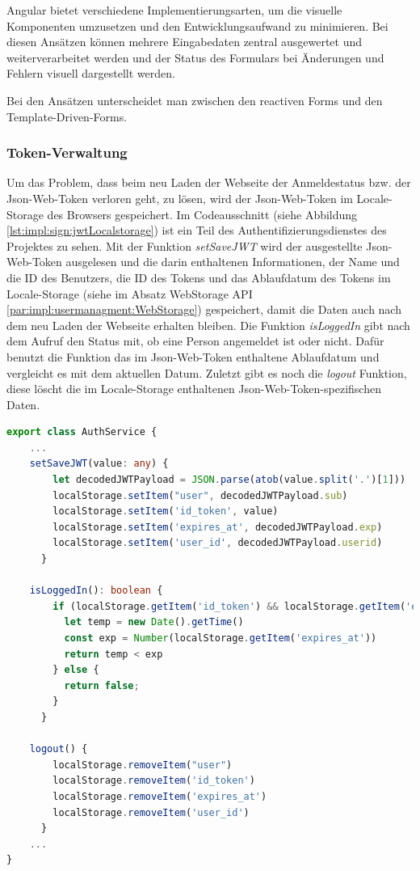 Angular bietet verschiedene Implementierungsarten, um die visuelle Komponenten umzusetzen und den Entwicklungsaufwand zu minimieren. Bei diesen Ansätzen können mehrere Eingabedaten zentral ausgewertet und weiterverarbeitet werden und der Status des Formulars bei Änderungen und Fehlern visuell dargestellt werden. \cite[Bookmonkey - 12 Formularverarbeitung und
Validierung: Iteration IV]{AngularBuch}

Bei den Ansätzen unterscheidet man zwischen den reactiven Forms und den Template-Driven-Forms.

\subsubsection{Token-Verwaltung}
\label{sec:tokenveraltung}
Um das Problem, dass beim neu Laden der Webseite der Anmeldestatus bzw. der Json-Web-Token verloren geht, zu lösen, wird der Json-Web-Token im Locale-Storage des Browsers gespeichert. 
Im Codeausschnitt (siehe Abbildung \ref{lst:impl:sign:jwtLocalstorage}) ist ein Teil des Authentifizierungsdienstes des Projektes zu sehen. Mit der Funktion \emph{setSaveJWT} wird der ausgestellte Json-Web-Token ausgelesen und die darin enthaltenen Informationen, der Name und die ID des Benutzers, die ID des Tokens und das Ablaufdatum des Tokens im Locale-Storage (siehe im Absatz WebStorage API \ref{par:impl:usermanagment:WebStorage}) gespeichert, damit die Daten auch nach dem neu Laden der Webseite erhalten bleiben. Die Funktion \emph{isLoggedIn} gibt nach dem Aufruf den Status mit, ob eine Person angemeldet ist oder nicht. Dafür benutzt die Funktion das im Json-Web-Token enthaltene Ablaufdatum und vergleicht es mit dem aktuellen Datum. Zuletzt gibt es noch die \emph{logout} Funktion, diese löscht die im Locale-Storage enthaltenen Json-Web-Token-spezifischen Daten.

\begin{lstlisting}[caption=auth.service.ts - Json-Web-Token und Localstorage,label=lst:impl:sign:jwtLocalstorage,language=TypeScript ]
export class AuthService {
    ...
    setSaveJWT(value: any) {
        let decodedJWTPayload = JSON.parse(atob(value.split('.')[1]))
        localStorage.setItem("user", decodedJWTPayload.sub)
        localStorage.setItem('id_token', value)
        localStorage.setItem('expires_at', decodedJWTPayload.exp)
        localStorage.setItem('user_id', decodedJWTPayload.userid)
      }

    isLoggedIn(): boolean {
        if (localStorage.getItem('id_token') && localStorage.getItem('expires_at')) {
          let temp = new Date().getTime()
          const exp = Number(localStorage.getItem('expires_at'))
          return temp < exp
        } else {
          return false;
        }
      }

    logout() {
        localStorage.removeItem("user")
        localStorage.removeItem('id_token')
        localStorage.removeItem('expires_at')
        localStorage.removeItem('user_id')
      }
    ...
}        
\end{lstlisting}

